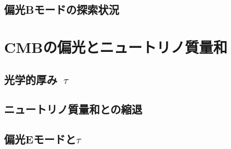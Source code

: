 \subsection{偏光Bモードの探索状況}

\section{CMBの偏光とニュートリノ質量和}

\subsection{光学的厚み~$\tau$}

\subsection{ニュートリノ質量和との縮退}

\subsection{偏光Eモードと$\tau$}
\label{E_and_tau}
